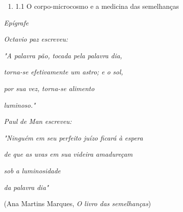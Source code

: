 \begin{enumerate}
\def\labelenumi{\arabic{enumi}.}
\tightlist
\item
  1.1 O corpo-microcosmo e a medicina das semelhanças
\end{enumerate}

\emph{Epígrafe}

\emph{Octavio paz escreveu:}

\emph{"A palavra pão, tocada pela palavra dia, }

\emph{torna-se efetivamente um astro; e o sol, }

\emph{por sua vez, torna-se alimento }

\emph{luminoso."}

\emph{Paul de Man escreveu:}

\emph{"Ninguém em seu perfeito juízo ficará à espera}

\emph{de que as uvas em sua videira amadureçam}

\emph{sob a luminosidade}

\emph{da palavra dia"}

(Ana Martins Marques, \emph{O livro das semelhanças})


